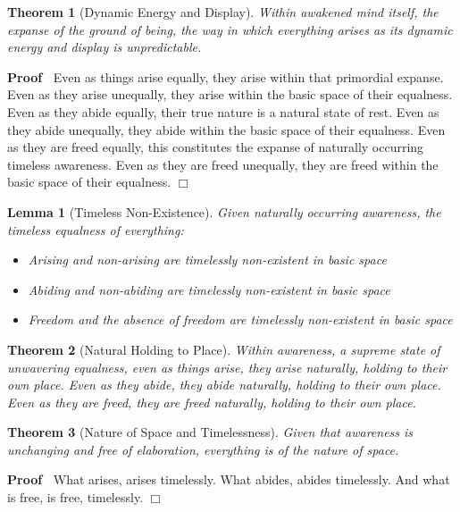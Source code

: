 \documentclass{article}
\newenvironment{proof}{\noindent\textbf{Proof\ }}{\hspace*{\fill}$\Box$\medskip}
\newtheorem{lemma}{Lemma}
\newtheorem{theorem}{Theorem}
\begin{document}
\begin{theorem}
  [Dynamic Energy and Display] Within awakened mind itself, the expanse of the
  ground of being, the way in which everything arises as its dynamic energy
  and display is unpredictable.
\end{theorem}

\begin{proof}
  Even as things arise equally, they arise within that primordial expanse.
  Even as they arise unequally, they arise within the basic space of their
  equalness. Even as they abide equally, their true nature is a natural state
  of rest. Even as they abide unequally, they abide within the basic space of
  their equalness. Even as they are freed equally, this constitutes the
  expanse of naturally occurring timeless awareness. Even as they are freed
  unequally, they are freed within the basic space of their equalness.
\end{proof}

\begin{lemma}
  [Timeless Non-Existence] Given naturally occurring awareness, the timeless
  equalness of everything:
  \begin{itemize}
    \item Arising and non-arising are timelessly non-existent in basic space
    
    \item Abiding and non-abiding are timelessly non-existent in basic space
    
    \item Freedom and the absence of freedom are timelessly non-existent in
    basic space
  \end{itemize}
\end{lemma}

\begin{theorem}
  [Natural Holding to Place] Within awareness, a supreme state of unwavering
  equalness, even as things arise, they arise naturally, holding to their own
  place. Even as they abide, they abide naturally, holding to their own place.
  Even as they are freed, they are freed naturally, holding to their own
  place.
\end{theorem}

\begin{theorem}
  [Nature of Space and Timelessness] Given that awareness is unchanging and
  free of elaboration, everything is of the nature of space.
\end{theorem}

\begin{proof}
  What arises, arises timelessly. What abides, abides timelessly. And what is
  free, is free, timelessly.
\end{proof}
\end{document}
